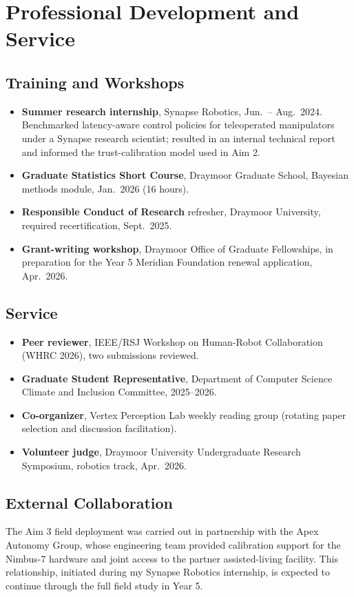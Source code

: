 \section{Professional Development and Service}

\subsection{Training and Workshops}

\begin{itemize}
  \item \textbf{Summer research internship}, Synapse Robotics, Jun.\ -- Aug.\ 2024. Benchmarked
    latency-aware control policies for teleoperated manipulators under a Synapse research
    scientist; resulted in an internal technical report and informed the trust-calibration
    model used in Aim 2.
  \item \textbf{Graduate Statistics Short Course}, Draymoor Graduate School, Bayesian methods
    module, Jan.\ 2026 (16 hours).
  \item \textbf{Responsible Conduct of Research} refresher, Draymoor University, required
    recertification, Sept.\ 2025.
  \item \textbf{Grant-writing workshop}, Draymoor Office of Graduate Fellowships, in preparation
    for the Year 5 Meridian Foundation renewal application, Apr.\ 2026.
\end{itemize}

\subsection{Service}

\begin{itemize}
  \item \textbf{Peer reviewer}, IEEE/RSJ Workshop on Human-Robot Collaboration (WHRC 2026), two
    submissions reviewed.
  \item \textbf{Graduate Student Representative}, Department of Computer Science Climate and
    Inclusion Committee, 2025--2026.
  \item \textbf{Co-organizer}, Vertex Perception Lab weekly reading group (rotating paper
    selection and discussion facilitation).
  \item \textbf{Volunteer judge}, Draymoor University Undergraduate Research Symposium, robotics
    track, Apr.\ 2026.
\end{itemize}

\subsection{External Collaboration}

The Aim 3 field deployment was carried out in partnership with the Apex Autonomy Group, whose
engineering team provided calibration support for the Nimbus-7 hardware and joint access to the
partner assisted-living facility. This relationship, initiated during my Synapse Robotics
internship, is expected to continue through the full field study in Year 5.
